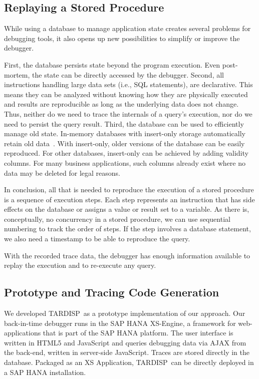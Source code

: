 \documentclass[english,conference,final]{IEEEtran}
\newcommand{\todo}[2][]{\pdfmargincomment[author={#1}]{#2}}
\newcommand{\tool}{TAR\-DISP}
\begin{document}
\subsection{Replaying a Stored Procedure}

While using a database to manage application state creates several problems for debugging tools, it also opens up new possibilities to simplify or improve the debugger.

First, the database persists state beyond the program execution.
Even post-mortem, the state can be directly accessed by the debugger.
Second, all instructions handling large data sets (i.e., SQL statements), are declarative.
This means they can be analyzed without knowing how they are physically executed and results are reproducible as long as the underlying data does not change.
Thus, neither do we need to trace the internals of a query's execution, nor do we need to persist the query result.
Third, the database can be used to efficiently manage old state.
In-memory databases with insert-only storage automatically retain old data~\cite{Plattner2009Acd}.
With insert-only, older versions of the database can be easily reproduced.
For other databases, insert-only can be achieved by adding validity columns.
For many business applications, such columns already exist where no data may be deleted for legal reasons.

In conclusion, all that is needed to reproduce the execution of a stored procedure is a sequence of execution steps.
Each step represents an instruction that has side effects on the database or assigns a value or result set to a variable.
As there is, conceptually, no concurrency in a stored procedure, we can use sequential numbering to track the order of steps.
If the step involves a database statement, we also need a timestamp to be able to reproduce the query.

With the recorded trace data, the debugger has enough information available to replay the execution and to re-execute any query.

\subsection{Prototype and Tracing Code Generation}

We developed \tool\ as a prototype implementation of our approach.
Our back-in-time debugger runs in the SAP HANA XS-Engine, a framework for web-applications that is part of the SAP HANA platform.
The user interface is written in HTML5 and JavaScript and queries debugging data via AJAX from the back-end, written in server-side JavaScript.
Traces are stored directly in the database.
Packaged as an XS Application, \tool\ can be directly deployed in a SAP HANA installation.
\end{document}
